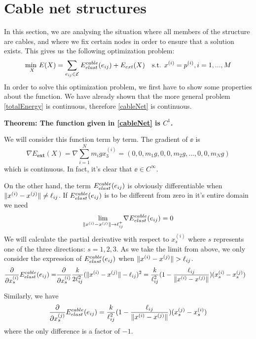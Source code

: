 \section{Cable net structures}
In this section, we are analysing the situation where all members of the structure are cables, and where we fix certain nodes in order to ensure that a solution exists. This gives us the following optimization problem:
\begin{equation}
    \underset{X}{\text{min }} E(X) = \sum\limits_{e_{ij} \in \mathcal{E}} E^{cable}_{elast}(e_{ij}) + E_{ext}(X) \quad \text{s.t. } x^{(i)} = p^{(i)}, i = 1,...,M
    \label{cableNet}
\end{equation}
In order to solve this optimization problem, we first have to show some properties about the function. We have already shown that the more general problem \eqref{totalEnergy} is continuous, therefore \eqref{cableNet} is continuous.

\textbf{Theorem: The function given in \eqref{cableNet} is $C^1$.}

We will consider this function term by term.
The gradient of $\ee$ is 
\begin{equation}
    \nabla E_{\textbf{ext}}(X) = \nabla \sum_{i=1}^N m_i g x_3^{(i)}
    = (0,0,m_1 g, 0,0,m_2 g,...,0,0,m_N g)
    \label{gradient_external_force}
\end{equation}
which is continuous. In fact, it's clear that $\ee \in C^{\infty}$.

On the other hand, the term $E^{cable}_{elast}(e_{ij})$ is obviously differentiable when $\lVert x^{(i)} - x^{(j)}\rVert \neq \ell_{ij}$. If $E^{cable}_{elast}(e_{ij})$ is to be different from zero in it's entire domain we need 
\begin{equation}
    \underset{\lVert x^{(i)} - x^{(j)}\rVert \to \ell_{ij} ^+}{\text{lim}} \nabla E^{cable}_{elast}(e_{ij}) = 0    
\end{equation}
We will calculate the partial derivative with respect to $x_s^{(i)}$ where $s$ represents one of the three directions: $s=1,2,3$. As we take the limit from above, we only consider the expression of $E^{cable}_{elast}(e_{ij})$ when $\lVert x^{(i)} - x^{(j)}\rVert > \ell_{ij}$.
\begin{align}
    \frac{\partial}{\partial x_s^{(i)}} E^{cable}_{elast}(e_{ij}) = &\frac{\partial}{\partial x_s^{(i)}}  \frac{k}{2 \ell_{ij}^2} (\lVert x^{(i)} - x^{(j)}\rVert - \ell_{ij})^2 = \frac{k}{\ell_{ij}^2} (1- \frac{\ell_{ij}}{\lVert x^{(i)} - x^{(j)}\rVert}) (x_s^{(i)} - x_s^{(j)})
\end{align}

Similarly, we have 
\begin{equation}
    \frac{\partial}{\partial x_s^{(j)}} E^{cable}_{elast}(e_{ij}) =  \frac{k}{\ell_{ij}^2} (1- \frac{\ell_{ij}}{\lVert x^{(i)} - x^{(j)}\rVert}) (x_s^{(j)} - x_s^{(i)})
\end{equation} where the only difference is a factor of $-1$.

